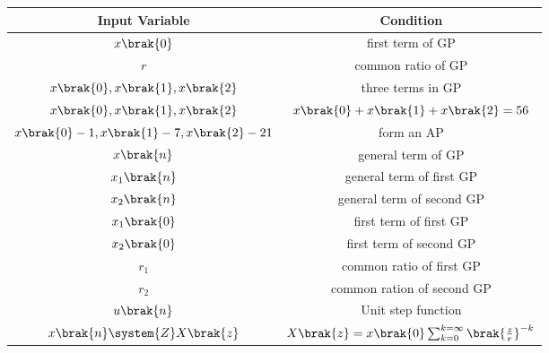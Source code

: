 \begin{tabular}{|c|c|}
        \hline
         Input Variable & Condition\\
        \hline
         $x\brak{0}$ & first term of GP\\
         \hline
         $r$ & common ratio of GP\\
         \hline
         $x\brak{0},x\brak{1},x\brak{2}$ & three terms in GP \\
         \hline
         $x\brak{0},x\brak{1},x\brak{2}$ & $x\brak{0}+x\brak{1}+x\brak{2}=56$ \\
         \hline
          $x\brak{0}-1,x\brak{1}-7,x\brak{2}-21$ & form an AP \\
         \hline
          $x\brak{n}$ & general term of GP \\
         \hline
           $x_1\brak{n}$ & general term of first GP\\
         \hline
           $x_2\brak{n}$ & general term of second GP\\
         \hline
           $x_1\brak{0}$ & first term of first GP\\
         \hline
           $x_2\brak{0}$ & first term of second GP\\
         \hline
           $r_1$ & common ratio of first GP\\
         \hline
           $r_2$ & common ration of second GP\\
         \hline
          $u\brak{n}$ & Unit step function  \\
         \hline
         $x\brak{n}\system{Z}X\brak{z}$ & $X\brak{z}=x\brak{0}\sum_{k=0}^{k=\infty}\brak{\frac{z}{r}}^{-k}$\\
         \hline
    \end{tabular}
